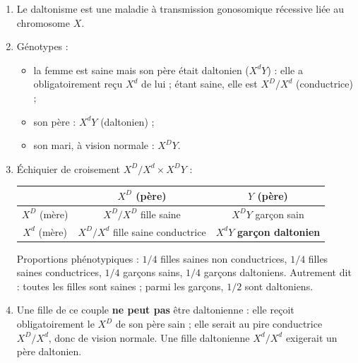 \documentclass[11pt]{article}
\newcommand{\cle}[1]{{\popxbold\color{popdark}#1}}
\begin{document}
\begin{corrige}
\begin{enumerate}
\item Le daltonisme est une maladie à transmission \cle{gonosomique récessive liée au chromosome $X$}.
\item Génotypes :
\begin{itemize}
\item la femme est saine mais son père était daltonien ($X^{d}Y$) : elle a obligatoirement reçu $X^{d}$ de lui ; étant saine, elle est $X^{D}/X^{d}$ (\cle{conductrice}) ;
\item son père : $X^{d}Y$ (daltonien) ;
\item son mari, à vision normale : $X^{D}Y$.
\end{itemize}
\item Échiquier de croisement $X^{D}/X^{d} \times X^{D}Y$ :
\begin{center}
\begin{tabular}{|c|c|c|}\hline
\rowcolor{popblueL} & $X^{D}$ (père) & $Y$ (père) \\ \hline
$X^{D}$ (mère) & $X^{D}/X^{D}$ fille saine & $X^{D}Y$ garçon sain \\ \hline
$X^{d}$ (mère) & $X^{D}/X^{d}$ fille saine conductrice & $X^{d}Y$ \textbf{garçon daltonien} \\ \hline
\end{tabular}
\end{center}
Proportions phénotypiques : $1/4$ filles saines non conductrices, $1/4$ filles saines conductrices, $1/4$ garçons sains, $1/4$ garçons daltoniens. Autrement dit : toutes les filles sont saines ; parmi les garçons, $1/2$ sont daltoniens.
\item Une fille de ce couple \textbf{ne peut pas} être daltonienne : elle reçoit obligatoirement le $X^{D}$ de son père sain ; elle serait au pire conductrice $X^{D}/X^{d}$, donc de vision normale. Une fille daltonienne $X^{d}/X^{d}$ exigerait un père daltonien.
\end{enumerate}
\end{corrige}
\end{document}
